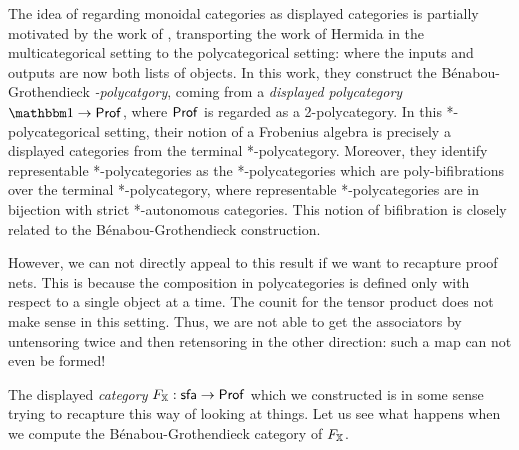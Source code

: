 The idea of regarding monoidal categories as displayed categories is partially motivated by the work of \cite{blanco}, transporting the work of Hermida in the multicategorical setting to the polycategorical setting:  where the inputs and outputs are now both lists of objects.  In this work, they construct the B\'enabou-Grothendieck {\em *-polycatgory}, coming from a {\em displayed polycategory} $\one\to \Prof$, where ${\sf Prof}$ is regarded as a 2-polycategory.  In this *-polycategorical setting, their notion of a Frobenius algebra is precisely  a displayed categories from the terminal *-polycategory.
Moreover, they identify representable *-polycategories as the  *-polycategories which are poly-bifibrations over the terminal *-polycategory, where representable *-polycategories are in bijection with strict *-autonomous categories.  This notion of bifibration is closely related to the B\'enabou-Grothendieck construction. 


However, we can not directly appeal to this result if we want to recapture proof nets.  This is because the composition in polycategories is defined only with respect to a single object at a time. The counit for the tensor product does not make sense in this setting.  Thus, we are not able to get the associators by untensoring twice and then retensoring in the other direction:  such a map can not even be formed!

The displayed {\em category} $F_{\mathbb{X}}:{\sf sfa}\to {\sf Prof}$ which we constructed is in some sense trying to recapture this way of looking at things.  Let us see what happens when we compute the B\'enabou-Grothendieck category of $F_{\mathbb{X}}$.

